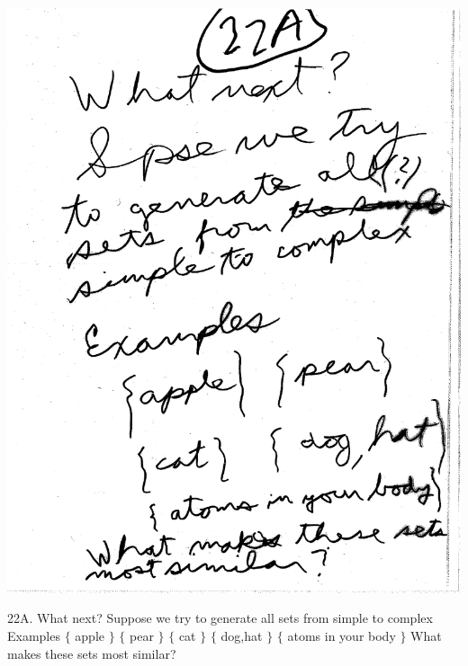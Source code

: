 \documentclass[10pt,a4paper]{article}
\begin{document}
\includegraphics[scale=.5]{Pages/Page_22A}

22A. What next? Suppose we try to generate all sets from simple to complex Examples $\{$ apple $\}$  $\{$ pear $\}$ $\{$ cat $\}$ $\{$ dog,hat $\}$ $\{$ atoms in your body $\}$ What makes these sets most similar? 

\vspace{.20 in}
\end{document}
